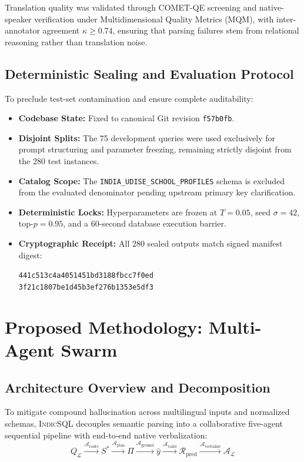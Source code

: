 \documentclass[conference]{IEEEtran}
\begin{document}
Translation quality was validated through COMET-QE screening and native-speaker verification under Multidimensional Quality Metrics (MQM), with inter-annotator agreement $\kappa \ge 0.74$, ensuring that parsing failures stem from relational reasoning rather than translation noise.

\subsection{Deterministic Sealing and Evaluation Protocol}
To preclude test-set contamination and ensure complete auditability:
\begin{itemize}
    \item \textbf{Codebase State:} Fixed to canonical Git revision \texttt{f57b0fb}.
    \item \textbf{Disjoint Splits:} The 75 development queries were used exclusively for prompt structuring and parameter freezing, remaining strictly disjoint from the 280 test instances.
    \item \textbf{Catalog Scope:} The \texttt{INDIA\_UDISE\_SCHOOL\_PROFILES} schema is excluded from the evaluated denominator pending upstream primary key clarification.
    \item \textbf{Deterministic Locks:} Hyperparameters are frozen at $T = 0.05$, seed $\sigma = 42$, top-$p = 0.95$, and a 60-second database execution barrier.
    \item \textbf{Cryptographic Receipt:} All 280 sealed outputs match signed manifest digest:
    \begin{center}
    \footnotesize\texttt{441c513c4a4051451bd3188fbcc7f0ed}\\
    \footnotesize\texttt{3f21c1807be1d45b3ef276b1353e5df3}
    \end{center}
\end{itemize}

\section{Proposed Methodology: Multi-Agent Swarm}\label{sec:methodology}

\subsection{Architecture Overview and Decomposition}
To mitigate compound hallucination across multilingual inputs and normalized schemas, \textsc{IndicSQL} decouples semantic parsing into a collaborative five-agent sequential pipeline with end-to-end native verbalization:
\begin{equation}
    Q_{\mathcal{L}} \xrightarrow{\mathcal{A}_{\text{route}}} S^* \xrightarrow{\mathcal{A}_{\text{plan}}} \Pi \xrightarrow{\mathcal{A}_{\text{ground}}} \hat{y} \xrightarrow{\mathcal{A}_{\text{valid}}} \mathcal{R}_{\text{pred}} \xrightarrow{\mathcal{A}_{\text{verbalize}}} \mathcal{A}_{\mathcal{L}}
\end{equation}
\end{document}
